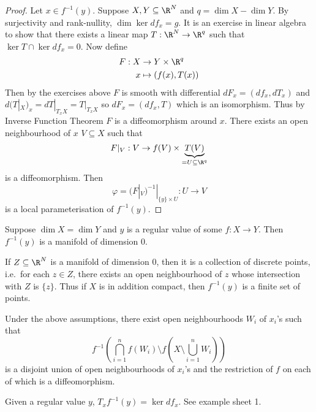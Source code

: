 \documentclass[a4paper]{article}
\begin{document}
\begin{proof}
  Let \(x \in f^{-1}(y)\). Suppose \(X, Y \subseteq \R^N\) and \(q = \dim X - \dim Y\). By surjectivity and rank-nullity, \(\dim \ker df_x = g\). It is an exercise in linear algebra to show that there exists a linear map \(T: \R^N \to \R^q\) such that \(\ker T \cap \ker df_x = 0\). Now define
  \begin{align*}
    F: X &\to Y \times \R^q \\
    x &\mapsto (f(x), T(x))
  \end{align*}
  Then by the exercises above \(F\) is smooth with differential \(dF_x = (df_x, dT_x)\) and \(d(T|_X)_x = dT|_{T_xX} = T|_{T_xX}\) so \(dF_x = (df_x, T)\) which is an isomorphism. Thus by Inverse Function Theorem \(F\) is a diffeomorphism around \(x\). There exists an open neighbourhood of \(x\) \(V \subseteq X\) such that
  \[
    F|_V: V \to f(V) \times \underbrace{T(V)}_{= U \subseteq \R^q}
  \]
  is a diffeomorphism. Then
  \[
    \varphi = (F|_V)^{-1}|_{\{y\} \times U}: U \to V
  \]
  is a local parameterisation of \(f^{-1}(y)\).
\end{proof}

\begin{corollary}
  Suppose \(\dim X = \dim Y\) and \(y\) is a regular value of some \(f: X \to Y\). Then \(f^{-1}(y)\) is a manifold of dimension \(0\).
\end{corollary}

If \(Z \subseteq \R^N\) is a manifold of dimension \(0\), then it is a collection of discrete points, i.e.\ for each \(z \in Z\), there exists an open neighbourhood of \(z\) whose intersection with \(Z\) is \(\{z\}\). Thus if \(X\) is in addition compact, then \(f^{-1}(y)\) is a finite set of points.

\begin{theorem}
  Under the above assumptions, there exist open neighbourhoods \(W_i\) of \(x_i\)'s such that
  \[
    f^{-1}\left(\bigcap_{i = 1}^n f(W_i) \setminus f(X \setminus \bigcup_{i = 1}^n W_i)\right)
  \]
  is a disjoint union of open neighbourhoods of \(x_i\)'s and the restriction of \(f\) on each of which is a diffeomorphism.
\end{theorem}

Given a regular value \(y\), \(T_xf^{-1}(y) = \ker df_x\). See example sheet 1.
\end{document}
